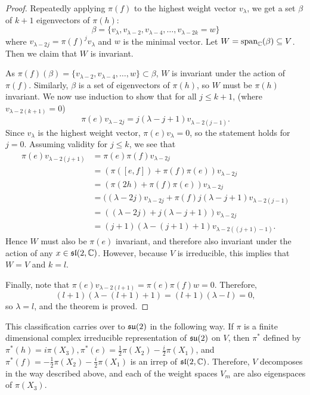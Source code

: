 \documentclass[a4paper]{article}
\begin{document}
\begin{proof}
    Repeatedly applying $\pi(f)$ to the highest weight vector $v_{\lambda}$, we get a set $\beta$ of $k+1$ eigenvectors of $\pi(h)$:
    $$\beta = \{v_{\lambda}, v_{\lambda -2}, v_{\lambda -4}, \hdots, v_{\lambda - 2k} = w\}$$ 
    where $v_{\lambda -2j} = \pi(f)^j v_{\lambda}$ and $w$ is the minimal vector. Let $W = \text{span}_{\mathbb{C}}(\beta) \subseteq V$. Then we claim that $W$ is invariant.

    As $\pi(f)(\beta) = \{v_{\lambda -2}, v_{\lambda -4}, \hdots, w\} \subset \beta$, $W$ is invariant under the action of $\pi(f)$. Similarly, $\beta$ is a set of eigenvectors of $\pi(h)$, so $W$ must be $\pi(h)$ invariant. We now use induction to show that for all $j \leq k + 1$, (where $v_{\lambda - 2(k+1)} = 0$)
    $$\pi(e)v_{\lambda - 2j} = j(\lambda-j+1)v_{\lambda - 2(j-1)}.$$ 
    Since $v_{\lambda}$ is the highest weight vector, $\pi(e)v_{\lambda} = 0$, so the statement holds for $j=0$. Assuming validity for $j \leq k$, we see that 
    \begin{align*}
        \pi(e) v_{\lambda-2(j+1)} &= \pi(e) \pi(f) v_{\lambda-2 j} \\
            &=(\pi([e, f])+\pi(f) \pi(e)) v_{\lambda-2 j} \\
            &=(\pi(2 h)+\pi(f) \pi(e)) v_{\lambda-2 j} \\
            &=((\lambda-2 j) v_{\lambda-2 j}+\pi(f) j(\lambda-j+1) v_{\lambda-2(j-1)}\\
            &=((\lambda-2 j)+j(\lambda-j+1)) v_{\lambda-2 j} \\
            &=(j+1)(\lambda-(j+1)+1) v_{\lambda-2((j+1)-1)}.
    \end{align*}
    Hence $W$ must also be $\pi(e)$ invariant, and therefore also invariant under the action of any $x \in \mathfrak{sl}(2, \mathbb{C})$. However, because $V$ is irreducible, this implies that $W=V$ and $k=l$.

    Finally, note that $\pi(e)v_{\lambda-2(l+1)} = \pi(e)\pi(f)w = 0$. Therefore, $$(l + 1)(\lambda-(l+1)+1) = (l + 1)(\lambda-l) = 0,$$
    so $\lambda = l$, and the theorem is proved.
\end{proof}

This classification carries over to $\mathfrak{su}(2)$ in the following way. If $\pi$ is a finite dimensional complex irreducible representation of $\mathfrak{su}(2)$ on $V$, then $\pi^*$ defined by $\pi^*({h}) = i\pi(X_3), \pi^*({e}) = \frac{1}{2}\pi(X_2) - \frac{i}{2}\pi(X_1)$, and $\pi^*({f}) = -\frac{1}{2}\pi(X_2) - \frac{i}{2}\pi(X_1)$ is an irrep of $\mathfrak{sl}(2, \mathbb{C})$. Therefore, $V$ decomposes in the way described above, and each of the weight spaces $V_m$ are also eigenspaces of $\pi(X_3)$.
\end{document}

